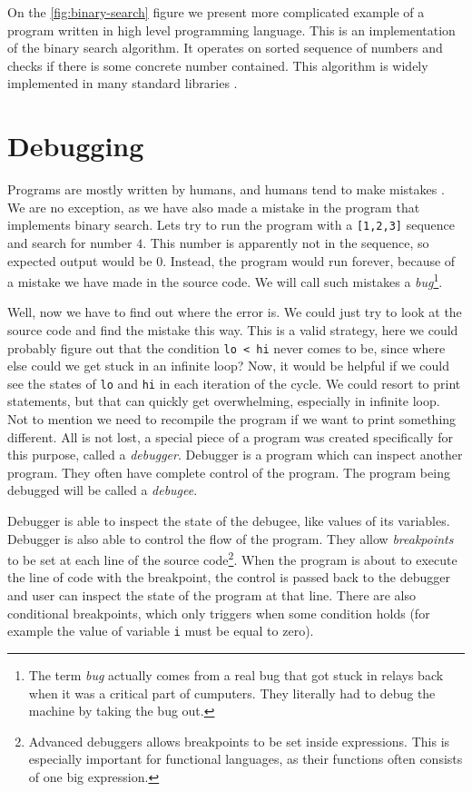 On the \ref{fig:binary-search} figure we present more complicated example of a program written in high level programming language. This
is an implementation of the binary search algorithm. It operates on sorted sequence of numbers and checks
if there is some concrete number contained. This algorithm is widely implemented in many standard libraries .

\section{Debugging}
Programs are mostly written by humans, and humans tend to make mistakes \cite{human-error}.
We are no exception, as we have also made a mistake in the program that implements binary search.
Lets try to run the program with a \texttt{[1,2,3]} sequence and search for number $4$. This
number is apparently not in the sequence, so expected output would be $0$. Instead, the program would run forever,
because of a mistake we have made in the source code. We will call such mistakes
a \textit{bug}\footnote{The term \textit{bug} actually comes from a real bug that got stuck in relays back when it was a critical part of cumputers.
They literally had to debug the machine by taking the bug out.}.

Well, now we have to find out where the error is. We could just try to look at the source code and
find the mistake this way. This is a valid strategy, here we could probably
figure out that the condition \texttt{lo < hi} never comes to be, since where else could we get
stuck in an infinite loop? Now, it would be helpful if we could see the states of \texttt{lo} and
\texttt{hi} in each iteration of the cycle. We could resort to print statements, but that can
quickly get overwhelming, especially in infinite loop. Not to mention we need to recompile
the program if we want to print something different. All is not lost, a special
piece of a program was created specifically for this purpose, called a \textit{debugger}.
Debugger is a program which can inspect another program. They often have complete control of the program.
The program being debugged will be called a \textit{debugee}.

Debugger is able to inspect the state of the debugee, like values of its variables. Debugger is also able to control
the flow of the program. They allow \textit{breakpoints} to be set at each line of the source code\footnote{Advanced debuggers allows breakpoints to be set inside expressions.
This is especially important for functional languages, as their functions often consists of one big expression.}.
When the program is about to execute the line of code with the breakpoint, the control is passed back to the
debugger and user can inspect the state of the program at that line. There are also conditional breakpoints,
which only triggers when some condition holds (for example the value of variable \texttt{i} must be equal to zero).

